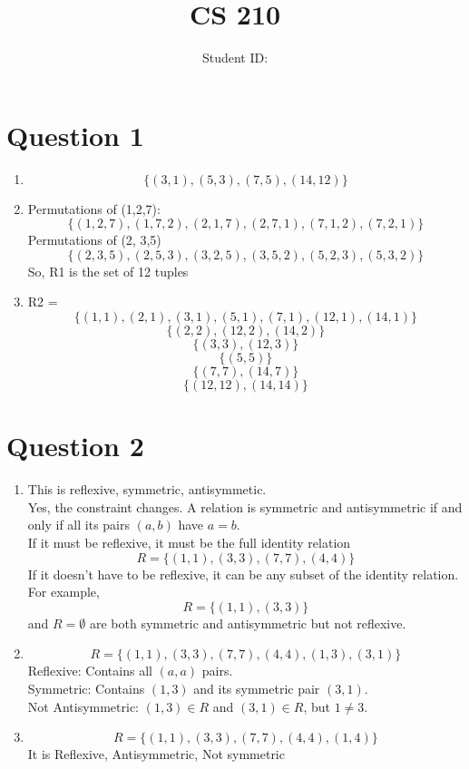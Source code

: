 \documentclass[twoside]{article}
\title{CS 210 \hwNo}
\author{\myname \qquad Student ID:\myid}
\date{\currentdate}
\begin{document}
\maketitle

\section*{Question 1}

\begin{enumerate}
    \item[(a.)] 
    \[\{ (3, 1), (5, 3), (7, 5), (14, 12) \} \]
    \item[(b.)]
    Permutations of (1,2,7): 
    \[ \{ (1,2,7), (1,7,2), (2,1,7), (2,7,1), (7,1,2), (7,2,1) \}\]
    Permutations of (2, 3,5)
    \[ \{ (2,3,5), (2,5,3), (3,2,5), (3,5,2), (5,2,3), (5,3,2)\}\]
    So, R1 is the set of 12 tuples
    \item[(c.)]
    R2 = 
    \[ \{ (1,1), (2,1), (3,1), (5,1), (7,1), (12,1), (14,1) \}\]
    \[ \{ (2,2), (12,2), (14,2) \}\]
    \[ \{ (3,3), (12,3) \}\]
    \[ \{ (5,5) \}\]
    \[ \{ (7,7), (14,7) \}\]
    \[ \{ (12,12), (14,14)\}\]

\end{enumerate}

\section*{Question 2}
\begin{enumerate}
    \item[(a)]  This is reflexive, symmetric, antisymmetic. \\
                Yes, the constraint changes. A relation is symmetric and antisymmetric if and only if all its pairs $(a,b)$ have $a=b$. \\
                If it must be reflexive, it must be the full identity relation  \[R = \{(1,1), (3,3), (7,7), (4,4)\} \]
                If it doesn't have to be reflexive, it can be any subset of the identity relation. For example, \[ R = \{(1,1), (3,3)\} \] and $R = \emptyset$ are both symmetric and antisymmetric but not reflexive. 

    \item[(b)]  \[R = \{(1,1), (3,3), (7,7), (4,4), (1,3), (3,1)\} \] 
                Reflexive: Contains all $(a,a)$ pairs. \\
                Symmetric: Contains $(1,3)$ and its symmetric pair $(3,1)$. \\
                Not Antisymmetric: $(1,3) \in R$ and $(3,1) \in R$, but $1 \neq 3$. 

    \item[(c)]  \[R = \{(1,1), (3,3), (7,7), (4,4), (1,4)\} \]
                It is Reflexive, Antisymmetric, Not symmetric
\end{enumerate}
\end{document}

